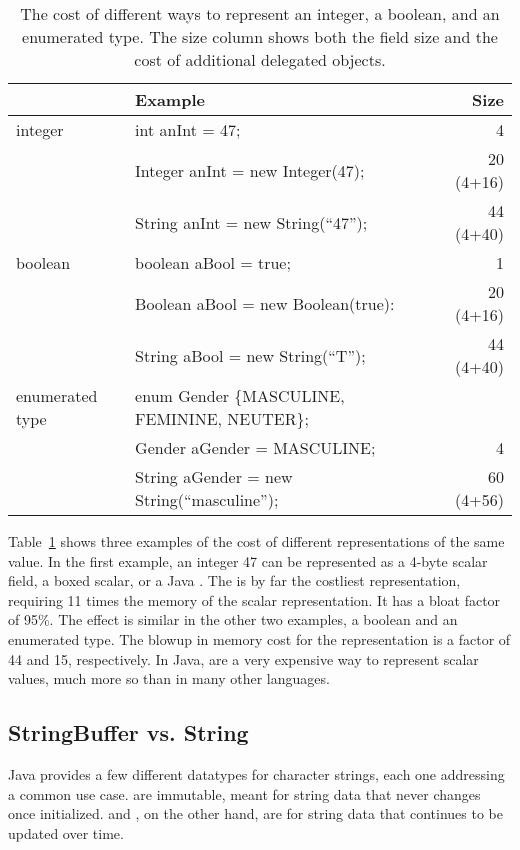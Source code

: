 \begin{table}
  \centering
\begin{tabular}{llr} \toprule \toprule
& Example & Size \\ \midrule \midrule
integer & int anInt = 47; & 4 \\
\midrule
& Integer anInt = new Integer(47); & 20 (4+16)  \\
\midrule
& String anInt = new String(``47''); & 44 (4+40) \\
\midrule
\midrule
boolean & boolean aBool = true; & 1\\
\midrule
& Boolean aBool = new Boolean(true): & 20 (4+16) \\
\midrule
& String aBool = new String(``T''); & 44 (4+40) \\
\midrule \midrule
enumerated type & enum Gender \{MASCULINE, FEMININE, NEUTER\}; &\\
& Gender aGender = MASCULINE; & 4 \\
\midrule
& String aGender = new String(``masculine''); & 60 (4+56) \\
\bottomrule \bottomrule
\end{tabular}
\caption{The cost of different ways to represent an integer, a boolean, and an
enumerated type. The size column shows both the field size and the cost of
additional delegated objects.}
\label{tab:scalar-data-sizes}
\end{table}

Table~\ref{tab:scalar-data-sizes} shows three examples of the cost of different
representations of the same value. In the first example, an integer 47 can be
represented as a 4-byte scalar field, a boxed scalar, or a Java . 
The  is by far the costliest representation, requiring 11 times
the memory of the scalar representation. It has a bloat factor of 95\%.
The effect is similar in the other two examples, a boolean and an enumerated
type. The blowup in memory cost for the  representation is a
factor of 44 and 15, respectively. In Java,  are a very expensive way to
represent scalar values, much more so than in many other languages.

\subsection{StringBuffer vs. String}
Java provides a few different datatypes for character strings, each one
addressing a common use case.  are immutable, meant for
string data that never changes once initialized.  and
, on the other hand, are for string data that continues to
be updated over time.


